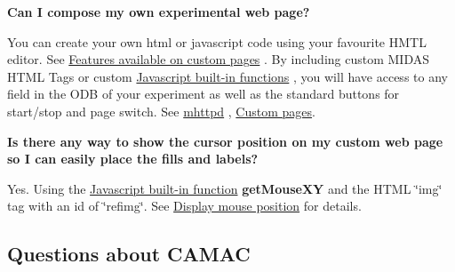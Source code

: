 \begin{DoxyEnumerate}
\item {\bfseries  Can I compose my own experimental web page?}
\begin{DoxyItemize}
\item You can create your own html or javascript code using your favourite HMTL editor. See \hyperlink{RC_mhttpd_custom_features}{Features available on custom pages} . By including custom MIDAS HTML Tags or custom \hyperlink{RC_mhttpd_custom_js_lib}{Javascript built-\/in functions} , you will have access to any field in the ODB of your experiment as well as the standard buttons for start/stop and page switch. See \hyperlink{RC_mhttpd_utility}{mhttpd} , \hyperlink{RC_mhttpd_Custom_page}{Custom pages}. \par
\par

\end{DoxyItemize}


\item {\bfseries  Is there any way to show the cursor position on my custom web page so I can easily place the fills and labels? }
\begin{DoxyItemize}
\item Yes. Using the \hyperlink{RC_mhttpd_custom_js_lib}{Javascript built-\/in function} {\bfseries getMouseXY} and the HTML \char`\"{}img\char`\"{} tag with an id of \char`\"{}refimg\char`\"{}. See \hyperlink{RC_mhttpd_Image_access_RC_mhttpd_custom_getmouse}{Display mouse position} for details.
\end{DoxyItemize}


\end{DoxyEnumerate}

\par


\par
 \hypertarget{FAQ_FAQ_CAMAC}{}\subsection{Questions about CAMAC}\label{FAQ_FAQ_CAMAC}

